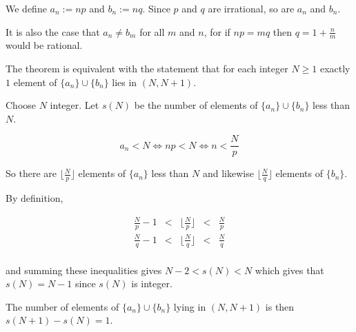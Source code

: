 \documentclass[12pt]{article}
\begin{document}
We define $a_n:=np$ and $b_n:=nq$. Since $p$ and $q$ are irrational, so are $a_n$ and $b_n$.

It is also the case that $a_n\neq b_m$ for all $m$ and $n$, for if $np=mq$ then $q=1+\frac{n}{m}$ would be rational.

The theorem is equivalent with the statement that for each integer $N\geq 1$ exactly $1$ element of $\{a_n\}\cup\{b_n\}$ lies in $(N,N+1)$.

Choose $N$ integer. Let $s(N)$ be the number of elements of $\{a_n\}\cup\{b_n\}$ less than $N$. 

$$a_n<N\Leftrightarrow np<N\Leftrightarrow n<\frac{N}{p}$$

So there are $\lfloor{\frac{N}{p}}\rfloor$ elements of $\{a_n\}$ less than $N$ and likewise $\lfloor{\frac{N}{q}}\rfloor$ elements of $\{b_n\}$.

By definition,

$$
\begin{array}{ccccc}
\frac{N}{p}-1&<& \lfloor {\frac{N}{p}}\rfloor&<&\frac{N}{p}\\
\frac{N}{q}-1&<& \lfloor {\frac{N}{q}}\rfloor&<&\frac{N}{q}\\
\end{array}
$$

and summing these inequalities gives $N-2<s(N)<N$ which gives that $s(N)=N-1$ since $s(N)$ is integer.

The number of elements of $\{a_n\}\cup\{b_n\}$ lying in $(N,N+1)$ is then $s(N+1)-s(N)=1$.
\end{document}
